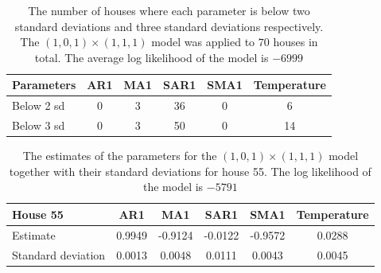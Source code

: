\begin{table}[]
    \centering
    \begin{tabular}{l|ccccc}
    \hline
    \textbf{Parameters} & \textbf{AR1} & \textbf{MA1} & \textbf{SAR1} & \textbf{SMA1} & \textbf{Temperature} \\ \hline \hline
    Below 2 sd & 0   & 3   & 36   & 0    & 6           \\
    Below 3 sd & 0   & 3   & 50   & 0    & 14          \\ \hline
    \end{tabular}
    \caption{The number of houses where each parameter is below two standard deviations and three standard deviations respectively. The $(1,0,1)\times (1,1,1)$ model was applied to $70$ houses in total. The average log likelihood of the model is $-6999$}
    \label{tab:ParamSig_Model1}
\end{table}

\begin{table}[]
    \centering
    \begin{tabular}{l|ccccc}
    \hline
    \textbf{House 55} & \textbf{AR1} & \textbf{MA1} & \textbf{SAR1} & \textbf{SMA1} & \textbf{Temperature} \\ \hline \hline
    Estimate           & 0.9949 & -0.9124 & -0.0122 & -0.9572 & 0.0288      \\
    Standard deviation & 0.0013 & 0.0048  & 0.0111  & 0.0043  & 0.0045      \\ \hline
    \end{tabular}
    \caption{The estimates of the parameters for the $(1,0,1)\times (1,1,1)$ model together with their standard deviations for house 55. The log likelihood of the model is $-5791$}
    \label{tab:ParamSig_House55}
 \end{table}


